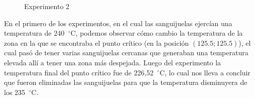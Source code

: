 \documentclass[10pt, a4paper]{article}
\begin{document}
\begin{figure}[H]
\centering
	\caption{Experimento 2} 
\end{figure}



En el primero de los experimentos, en el cual las sanguijuelas ejerc\'ian una temperatura de 240\hspace{-1.5mm}$\phantom{a}^{\circ}$C, podemos observar c\'omo cambio la temperatura de la zona en la que se encontraba el punto cr\'itico (en la posici\'on $(125.5;125.5)$), el cual pas\'o de tener varias sanguijuelas cercanas que generaban una temperatura elevada all\'i a tener una zona m\'as despejada. Luego del experimento la temperatura final del punto cr\'itico fue de 226,52\hspace{-1.5mm}$\phantom{a}^{\circ}$C, lo cual nos lleva a concluir que fueron eliminadas las sanguijuelas para que la temperatura disminuyera de los 235\hspace{-1.5mm}$\phantom{a}^{\circ}$C. 
\end{document}
